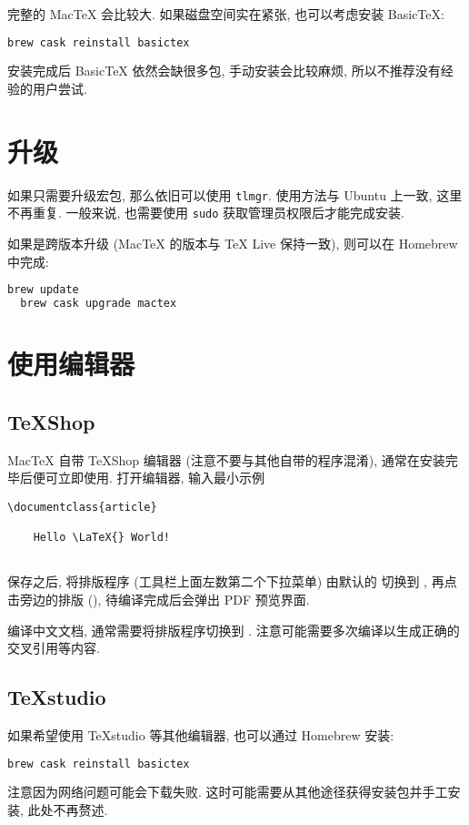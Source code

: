 完整的 Mac\TeX{} 会比较大. 如果磁盘空间实在紧张, 也可以考虑安装 Basic\TeX:
\begin{lstlisting}[language=bash]
  brew cask reinstall basictex
\end{lstlisting}
安装完成后 Basic\TeX{} 依然会缺很多包, 手动安装会比较麻烦, 所以不推荐没有经验的用户尝试.

\section{升级}

如果只需要升级宏包, 那么依旧可以使用 \texttt{tlmgr}. 使用方法与 Ubuntu 上一致, 这里不再重复.
一般来说, 也需要使用 \texttt{sudo} 获取管理员权限后才能完成安装.

如果是跨版本升级 (Mac\TeX{} 的版本与 \TeX{} Live 保持一致), 则可以在 Homebrew 中完成:
\begin{lstlisting}[language=bash]
  brew update
  brew cask upgrade mactex
\end{lstlisting}

\section{使用编辑器}

\subsection{\TeX Shop}

Mac\TeX{} 自带 \TeX Shop 编辑器 (注意不要与其他自带的程序混淆), 通常在安装完毕后便可立即使用.
打开编辑器, 输入最小示例
\begin{lstlisting}[language = {[LaTeX]TeX}]
  \documentclass{article}
  
    Hello \LaTeX{} World!
  
\end{lstlisting}
保存之后, 将排版程序 (工具栏上面左数第二个下拉菜单) 由默认的  切换到 ,
再点击旁边的排版  (), 待编译完成后会弹出 PDF 预览界面.

编译中文文档, 通常需要将排版程序切换到 .
注意可能需要多次编译以生成正确的交叉引用等内容.

\subsection{\TeX studio}

如果希望使用 \TeX studio 等其他编辑器, 也可以通过 Homebrew 安装:
\begin{lstlisting}[language=bash]
  brew cask reinstall basictex
\end{lstlisting}
注意因为网络问题可能会下载失败. 这时可能需要从其他途径获得安装包并手工安装, 此处不再赘述.
